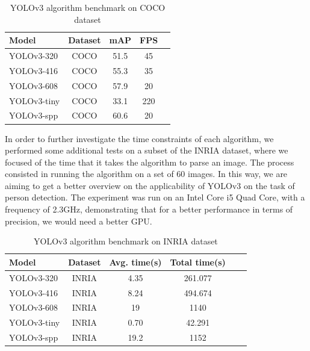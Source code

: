 \documentclass[runningheads,a4paper,11pt]{report}
\begin{document}
\begin{table}[htbp]
	\caption{YOLOv3 algorithm benchmark on COCO dataset}
	\label{tab3COCO}
		\begin{center}
			\begin{tabular}{p{100pt}c c c c}

				\textbf{Model}& \textbf{Dataset}& \textbf{mAP}& \textbf{FPS} \\
				\hline\hline
 				YOLOv3-320& COCO& 51.5& 45 \\
 				YOLOv3-416& COCO& 55.3& 35 \\
 				YOLOv3-608& COCO& 57.9& 20 \\
 				YOLOv3-tiny& COCO& 33.1& 220 \\
 				YOLOv3-spp& COCO& 60.6& 20 \\
			\end{tabular}
		\end{center}
\end{table}


In order to further investigate the time constraints of each algorithm, we performed some additional tests on a subset of the INRIA dataset, where we focused of the time that it takes the algorithm to parse an image. The process consisted in running the algorithm on a set of 60 images. In this way, we are aiming to get a better overview on the applicability of YOLOv3 on the task of person detection. The experiment was run on an Intel Core i5 Quad Core, with a frequency of 2.3GHz, demonstrating that for a better performance in terms of precision, we would need a better GPU. 

\begin{table}[htbp]
	\caption{YOLOv3 algorithm benchmark on INRIA dataset}
	\label{tab3INRIA}
		\begin{center}
			\begin{tabular}{p{100pt}c c c c c}

				\textbf{Model}& \textbf{Dataset}& \textbf{Avg. time(s)}& \textbf{Total time(s)} \\
				\hline\hline
 				YOLOv3-320& INRIA& 4.35& 261.077\\
 				YOLOv3-416& INRIA& 8.24& 494.674\\
 				YOLOv3-608& INRIA& 19& 1140\\
 				YOLOv3-tiny& INRIA& 0.70& 42.291\\
 				YOLOv3-spp& INRIA& 19.2& 1152\\
			\end{tabular}
		\end{center}
\end{table}
\end{document}
